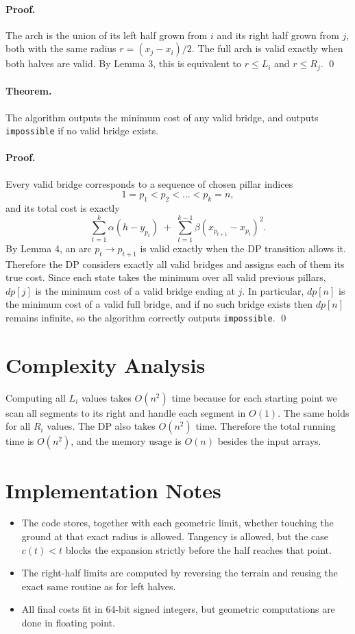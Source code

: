\documentclass[11pt]{article}
\begin{document}
\paragraph{Proof.}
The arch is the union of its left half grown from $i$ and its right half grown from $j$, both with the same radius $r = (x_j - x_i)/2$. The full arch is valid exactly when both halves are valid. By Lemma 3, this is equivalent to $r \le L_i$ and $r \le R_j$. \qed

\paragraph{Theorem.}
The algorithm outputs the minimum cost of any valid bridge, and outputs \texttt{impossible} if no valid bridge exists.

\paragraph{Proof.}
Every valid bridge corresponds to a sequence of chosen pillar indices
\[
1 = p_1 < p_2 < \dots < p_k = n,
\]
and its total cost is exactly
\[
\sum_{t=1}^{k} \alpha (h - y_{p_t})
\;+\;
\sum_{t=1}^{k-1} \beta (x_{p_{t+1}} - x_{p_t})^2.
\]
By Lemma 4, an arc $p_t \to p_{t+1}$ is valid exactly when the DP transition allows it. Therefore the DP considers exactly all valid bridges and assigns each of them its true cost. Since each state takes the minimum over all valid previous pillars, $dp[j]$ is the minimum cost of a valid bridge ending at $j$. In particular, $dp[n]$ is the minimum cost of a valid full bridge, and if no such bridge exists then $dp[n]$ remains infinite, so the algorithm correctly outputs \texttt{impossible}. \qed

\section*{Complexity Analysis}

Computing all $L_i$ values takes $O(n^2)$ time because for each starting point we scan all segments to its right and handle each segment in $O(1)$. The same holds for all $R_i$ values. The DP also takes $O(n^2)$ time. Therefore the total running time is $O(n^2)$, and the memory usage is $O(n)$ besides the input arrays.

\section*{Implementation Notes}

\begin{itemize}[leftmargin=*]
    \item The code stores, together with each geometric limit, whether touching the ground at that exact radius is allowed. Tangency is allowed, but the case $c(t) < t$ blocks the expansion strictly before the half reaches that point.
    \item The right-half limits are computed by reversing the terrain and reusing the exact same routine as for left halves.
    \item All final costs fit in 64-bit signed integers, but geometric computations are done in floating point.
\end{itemize}
\end{document}

